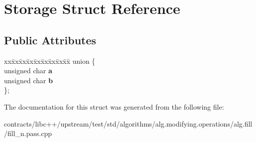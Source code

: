 \hypertarget{struct_storage}{}\section{Storage Struct Reference}
\label{struct_storage}
\subsection*{Public Attributes}
\begin{DoxyCompactItemize}
\item 
\mbox{\label{struct_storage_a9d447b1622cf1929e48b397f050dc4d1}} 
\begin{tabbing}
xx\=xx\=xx\=xx\=xx\=xx\=xx\=xx\=xx\=\kill
union \{\\
\>unsigned char {\bfseries a}\\
\>unsigned char {\bfseries b}\\
\}; \\

\end{tabbing}\end{DoxyCompactItemize}


The documentation for this struct was generated from the following file\+:\begin{DoxyCompactItemize}
\item 
contracts/libc++/upstream/test/std/algorithms/alg.\+modifying.\+operations/alg.\+fill/fill\+\_\+n.\+pass.\+cpp\end{DoxyCompactItemize}
